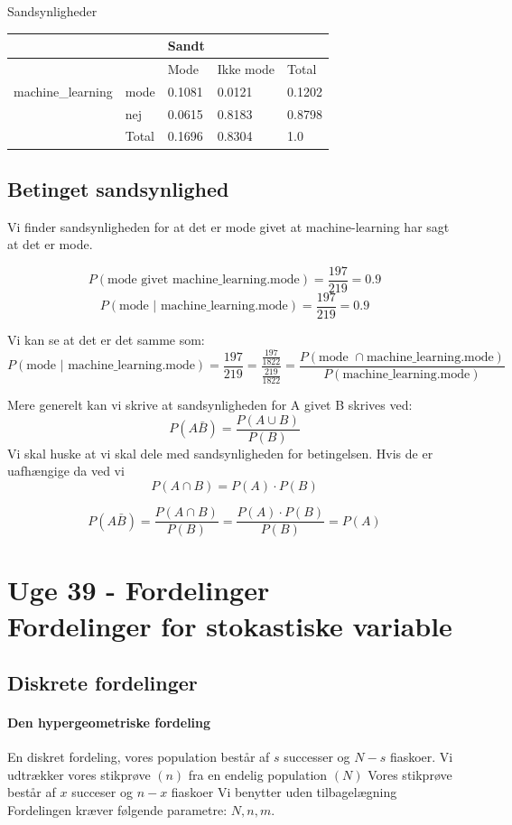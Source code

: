 \documentclass{article}
\begin{document}
Sandsynligheder

\begin{table}[H]
  \centering
  \begin{tabular}{l|l|l|l|l}
   &                    & Sandt  &           &        \\\hline
   &                                       & Mode   & Ikke mode & Total  \\\hline
   machine\_learning & mode & 0.1081 & 0.0121    & 0.1202 \\\hline
   & nej  & 0.0615 & 0.8183    & 0.8798 \\\hline
   & Total              & 0.1696 & 0.8304    & 1.0   
  \end{tabular}
\end{table}

\subsection{Betinget sandsynlighed}
Vi finder sandsynligheden for at det er mode givet at machine-learning har sagt
at det er mode.

$$P(\text{mode givet machine\_learning.mode}) = \frac{197}{219} = 0.9$$
$$P(\text{mode $|$ machine\_learning.mode}) = \frac{197}{219} = 0.9$$

Vi kan se at det er det samme som:
$$P(\text{mode $|$ machine\_learning.mode}) = \frac{197}{219} =
\frac{\frac{197}{1822}}{\frac{219}{1822}} = \frac{P(\text{mode $\cap$
machine\_learning.mode})}{P(\text{machine\_learning.mode})} $$

Mere generelt kan vi skrive at sandsynligheden for A givet B skrives ved:
$$P (A \bar B) = \frac{P( A \cup B)}{P(B)}$$ Vi skal huske at vi skal dele med
sandsynligheden for betingelsen. Hvis de er uafhængige da ved vi
$$P(A \cap B) = P(A) \cdot P(B) $$

$$P(A \bar B) = \frac{P(A\cap B)}{P(B)} = \frac{P(A) \cdot P(B)}{P(B)} = P(A)$$

\newpage
\section{Uge 39 - Fordelinger \\ Fordelinger for stokastiske variable} 

\subsection{Diskrete fordelinger}
\paragraph{Den hypergeometriske fordeling}
En diskret fordeling, vores population består af $s$ successer og $N-s$
fiaskoer. Vi udtrækker vores stikprøve $(n)$ fra en endelig population $(N)$
Vores stikprøve består af $x$ succeser og $n-x$ fiaskoer Vi benytter uden
tilbagelægning Fordelingen kræver følgende parametre: $N, n, m$.
\end{document}
